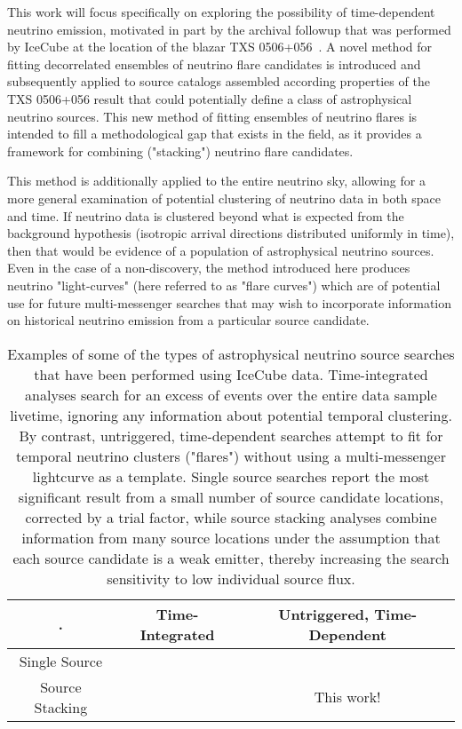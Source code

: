 This work will focus specifically on exploring the possibility of time-dependent neutrino emission, motivated in part by the archival followup that was performed by IceCube at the location of the blazar TXS 0506+056~\cite{TXS_Archival}. A novel method for fitting decorrelated ensembles of neutrino flare candidates is introduced and subsequently applied to source catalogs assembled according properties of the TXS 0506+056 result that could potentially define a class of astrophysical neutrino sources. This new method of fitting ensembles of neutrino flares is intended to fill a methodological gap that exists in the field, as it provides a framework for combining ("stacking") neutrino flare candidates. 

This method is additionally applied to the entire neutrino sky, allowing for a more general examination of potential clustering of neutrino data in both space and time. If neutrino data is clustered beyond what is expected from the background hypothesis (isotropic arrival directions distributed uniformly in time), then that would be evidence of a population of astrophysical neutrino sources. Even in the case of a non-discovery, the method introduced here produces neutrino "light-curves" (here referred to as "flare curves") which are of potential use for future multi-messenger searches that may wish to incorporate information on historical neutrino emission from a particular source candidate.  

\begin{table}[h!]
\centering
 \begin{tabular}{||c c c||} 
 \hline
 . & Time-Integrated & Untriggered, Time-Dependent\\ [0.5ex] 
 \hline\hline
 Single Source & \cite{10yr_tint} & \cite{TXS_Archival} \\ 
 \hline
 Source Stacking & \cite{2lac_ic} & This work! \\
 \hline
\end{tabular}
\caption{Examples of some of the types of astrophysical neutrino source searches that have been performed using IceCube data. Time-integrated analyses search for an excess of events over the entire data sample livetime, ignoring any information about potential temporal clustering. By contrast, untriggered, time-dependent searches attempt to fit for temporal neutrino clusters ("flares") without using a multi-messenger lightcurve as a template. Single source searches report the most significant result from a small number of source candidate locations, corrected by a trial factor, while source stacking analyses combine information from many source locations under the assumption that each source candidate is a weak emitter, thereby increasing the search sensitivity to low individual source flux. }
\label{tab:anatable}
\end{table}



